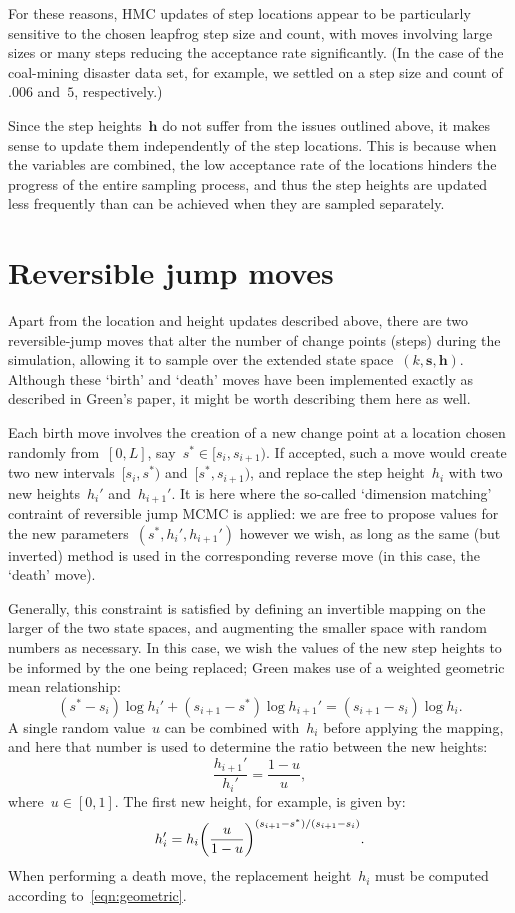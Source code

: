 \documentclass[11pt,a4paper]{article}
\newcommand\ub[1]{\symbf{#1}}                    %
\DeclarePairedDelimiter\lr{\lparen}{\rparen}     %
\theoremstyle{definition}
\begin{document}
For these reasons, HMC updates of step locations appear to be particularly
sensitive to the chosen leapfrog step size and count, with moves involving large
sizes or many steps reducing the acceptance rate significantly. (In the case of
the coal-mining disaster data set, for example, we settled on a step size and
count of~$.006$ and~$5$, respectively.)

Since the step heights~$\ub{h}$ do not suffer from the issues outlined above, it
makes sense to update them independently of the step locations. This is because
when the variables are combined, the low acceptance rate of the locations
hinders the progress of the entire sampling process, and thus the step heights
are updated less frequently than can be achieved when they are sampled
separately.

\section{Reversible jump moves} %

Apart from the location and height updates described above, there are two
reversible-jump moves that alter the number of change points (steps) during the
simulation, allowing it to sample over the extended state
space~$(k,\ub{s},\ub{h})$. Although these `birth' and `death' moves have been
implemented exactly as described in Green's paper, it might be worth describing
them here as well.

Each birth move involves the creation of a new change point at a location chosen
randomly from~$[0,L]$, say~$s^* \in [s_i, s_{i+1})$. If accepted, such a move
would create two new intervals~$[s_i, s^*)$ and~$[s^*, s_{i+1})$, and replace
the step height~$h_i$ with two new heights~$h_i'$ and~$h_{i+1}'$. It is here
where the so-called `dimension matching' contraint of reversible jump MCMC is
applied: we are free to propose values for the new parameters~$(s^*, h_i',
h_{i+1}')$ however we wish, as long as the same (but inverted) method is used in
the corresponding reverse move (in this case, the `death' move).

Generally, this constraint is satisfied by defining an invertible mapping on the
larger of the two state spaces, and augmenting the smaller space with random
numbers as necessary. In this case, we wish the values of the new step heights
to be informed by the one being replaced; Green makes use of a weighted
geometric mean relationship:
\begin{equation}\label{eqn:geometric}
  (s^* - s_i)\log h_i' + (s_{i+1} - s^*)\log h_{i+1}'
    = (s_{i+1} - s_i)\log h_i.
\end{equation}
A single random value~$u$ can be combined with~$h_i$ before applying the
mapping, and here that number is used to determine the ratio between the new
heights:
\[ \frac{h_{i+1}'}{h_i'} = \frac{1-u}{u}, \]
where~$u \in [0,1]$. The first new height, for example, is given by:
\[ h_i' = h_i \lr*{\frac{u}{1-u}}^{(s_{i+1}-s^*)/(s_{i+1}-s_i)}. \]
When performing a death move, the replacement height~$h_i$ must be computed
according to~\eqref{eqn:geometric}.
\end{document}
